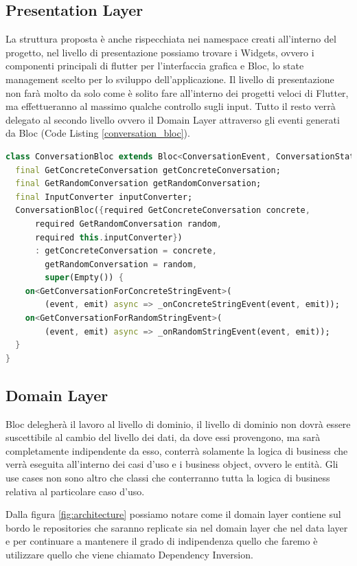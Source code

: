 \subsection{Presentation Layer}
La struttura proposta è anche rispecchiata nei namespace creati all'interno del progetto, nel livello di presentazione possiamo trovare i Widgets, ovvero i componenti principali di flutter per l'interfaccia grafica e Bloc, lo state management scelto per lo sviluppo dell'applicazione.
Il livello di presentazione non farà molto da solo come è solito fare all'interno dei progetti veloci di Flutter, ma effettueranno al massimo qualche controllo sugli input. Tutto il resto verrà delegato al secondo livello ovvero il Domain Layer attraverso gli eventi generati da Bloc (Code Listing \ref{conversation_bloc}).
\begin{lstlisting}[language=dart,caption=Presentation Layer: conversation\_bloc.dart,label=conversation_bloc]
class ConversationBloc extends Bloc<ConversationEvent, ConversationState> {
  final GetConcreteConversation getConcreteConversation;
  final GetRandomConversation getRandomConversation;
  final InputConverter inputConverter;
  ConversationBloc({required GetConcreteConversation concrete,
      required GetRandomConversation random,
      required this.inputConverter})
      : getConcreteConversation = concrete,
        getRandomConversation = random,
        super(Empty()) {
    on<GetConversationForConcreteStringEvent>(
        (event, emit) async => _onConcreteStringEvent(event, emit));
    on<GetConversationForRandomStringEvent>(
        (event, emit) async => _onRandomStringEvent(event, emit));
  }
}
\end{lstlisting}


\subsection{Domain Layer}
Bloc delegherà il lavoro al livello di dominio, il livello di dominio non dovrà essere suscettibile al cambio del livello dei dati, da dove essi provengono, ma sarà completamente indipendente da esso, conterrà solamente la logica di business che verrà eseguita all'interno dei casi d'uso e i business object, ovvero le entità. Gli use cases non sono altro che classi che conterranno tutta la logica di business relativa al particolare caso d'uso.

Dalla figura \ref{fig:architecture} possiamo notare come il domain layer contiene sul bordo le repositories che saranno replicate sia nel domain layer che nel data layer e per continuare a mantenere il grado di indipendenza quello che faremo è utilizzare quello che viene chiamato Dependency Inversion. 

